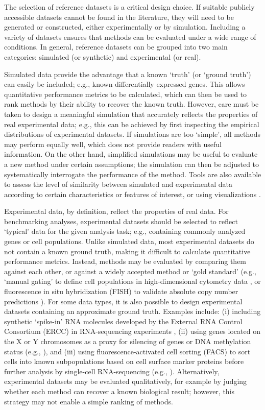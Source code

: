 \documentclass[12pt, a4paper]{article}
\begin{document}
The selection of reference datasets is a critical design choice. If suitable publicly accessible datasets cannot be found in the literature, they will need to be generated or constructed, either experimentally or by simulation. Including a variety of datasets ensures that methods can be evaluated under a wide range of conditions. In general, reference datasets can be grouped into two main categories: simulated (or synthetic) and experimental (or real).

Simulated data provide the advantage that a known `truth' (or `ground truth') can easily be included; e.g., known differentially expressed genes. This allows quantitative performance metrics to be calculated, which can then be used to rank methods by their ability to recover the known truth. However, care must be taken to design a meaningful simulation that accurately reflects the properties of real experimental data; e.g., this can be achieved by first inspecting the empirical distributions of experimental datasets. If simulations are too `simple', all methods may perform equally well, which does not provide readers with useful information. On the other hand, simplified simulations may be useful to evaluate a new method under certain assumptions; the simulation can then be adjusted to systematically interrogate the performance of the method. Tools are also available to assess the level of similarity between simulated and experimental data according to certain characteristics or features of interest, or using visualizations \citep{Soneson2017}.

Experimental data, by definition, reflect the properties of real data. For benchmarking analyses, experimental datasets should be selected to reflect `typical' data for the given analysis task; e.g., containing commonly analyzed genes or cell populations. Unlike simulated data, most experimental datasets do not contain a known ground truth, making it difficult to calculate quantitative performance metrics. Instead, methods may be evaluated by comparing them against each other, or against a widely accepted method or `gold standard' (e.g., `manual gating' to define cell populations in high-dimensional cytometry data \citep{Weber2016, Aghaeepour2013}, or fluorescence in situ hybridization (FISH) to validate absolute copy number predictions \citep{Zheng2017}). For some data types, it is also possible to design experimental datasets containing an approximate ground truth. Examples include: (i) including synthetic `spike-in' RNA molecules developed by the External RNA Control Consortium (ERCC) in RNA-sequencing experiments \citep{Jiang2011}, (ii) using genes located on the X or Y chromosomes as a proxy for silencing of genes or DNA methylation status (e.g., \citep{Law2014}), and (iii) using fluorescence-activated cell sorting (FACS) to sort cells into known subpopulations based on cell surface marker proteins before further analysis by single-cell RNA-sequencing (e.g., \citep{TabulaMuris2018}). Alternatively, experimental datasets may be evaluated qualitatively, for example by judging whether each method can recover a known biological result; however, this strategy may not enable a simple ranking of methods.
\end{document}
